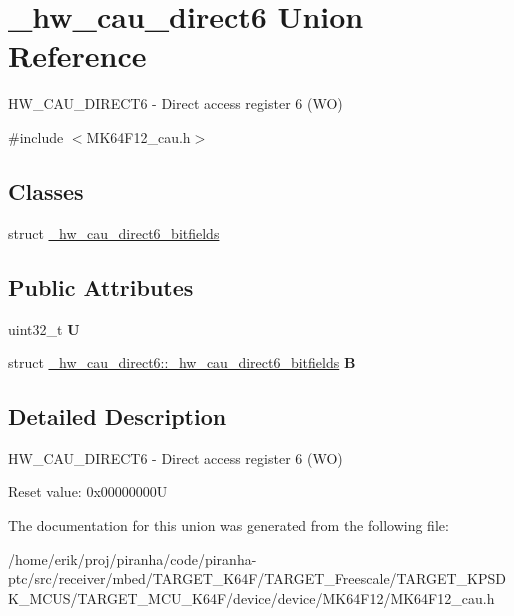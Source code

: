 \hypertarget{union__hw__cau__direct6}{}\section{\+\_\+hw\+\_\+cau\+\_\+direct6 Union Reference}
\label{union__hw__cau__direct6}


H\+W\+\_\+\+C\+A\+U\+\_\+\+D\+I\+R\+E\+C\+T6 -\/ Direct access register 6 (WO)  




{\ttfamily \#include $<$M\+K64\+F12\+\_\+cau.\+h$>$}

\subsection*{Classes}
\begin{DoxyCompactItemize}
\item 
struct \hyperlink{struct__hw__cau__direct6_1_1__hw__cau__direct6__bitfields}{\+\_\+hw\+\_\+cau\+\_\+direct6\+\_\+bitfields}
\end{DoxyCompactItemize}
\subsection*{Public Attributes}
\begin{DoxyCompactItemize}
\item 
uint32\+\_\+t {\bfseries U}\hypertarget{union__hw__cau__direct6_a81556066339fc6de85e12e31f8d0f5af}{}\label{union__hw__cau__direct6_a81556066339fc6de85e12e31f8d0f5af}

\item 
struct \hyperlink{struct__hw__cau__direct6_1_1__hw__cau__direct6__bitfields}{\+\_\+hw\+\_\+cau\+\_\+direct6\+::\+\_\+hw\+\_\+cau\+\_\+direct6\+\_\+bitfields} {\bfseries B}\hypertarget{union__hw__cau__direct6_a513d25f9352dd4ef23d78cdcb726c4e5}{}\label{union__hw__cau__direct6_a513d25f9352dd4ef23d78cdcb726c4e5}

\end{DoxyCompactItemize}


\subsection{Detailed Description}
H\+W\+\_\+\+C\+A\+U\+\_\+\+D\+I\+R\+E\+C\+T6 -\/ Direct access register 6 (WO) 

Reset value\+: 0x00000000U 

The documentation for this union was generated from the following file\+:\begin{DoxyCompactItemize}
\item 
/home/erik/proj/piranha/code/piranha-\/ptc/src/receiver/mbed/\+T\+A\+R\+G\+E\+T\+\_\+\+K64\+F/\+T\+A\+R\+G\+E\+T\+\_\+\+Freescale/\+T\+A\+R\+G\+E\+T\+\_\+\+K\+P\+S\+D\+K\+\_\+\+M\+C\+U\+S/\+T\+A\+R\+G\+E\+T\+\_\+\+M\+C\+U\+\_\+\+K64\+F/device/device/\+M\+K64\+F12/M\+K64\+F12\+\_\+cau.\+h\end{DoxyCompactItemize}
